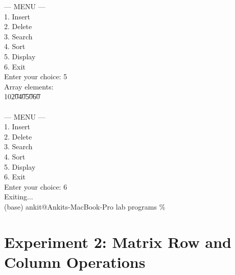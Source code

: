 \documentclass[12pt,a4paper]{article}
\begin{document}
\begin{tcolorbox}[terminalstyle, title=Sample Output]
{--- MENU ---\\
1. Insert\\
2. Delete\\
3. Search\\
4. Sort\\
5. Display\\
6. Exit\\
Enter your choice: 5\\
Array elements:\\
10\t20\t40\t50\t60\\
\\
--- MENU ---\\
1. Insert\\
2. Delete\\
3. Search\\
4. Sort\\
5. Display\\
6. Exit\\
Enter your choice: 6\\
Exiting...\\
(base) ankit@Ankits-MacBook-Pro lab programs \%
}
\end{tcolorbox}












\newpage
\section*{Experiment 2: Matrix Row and Column Operations}
\end{document}
